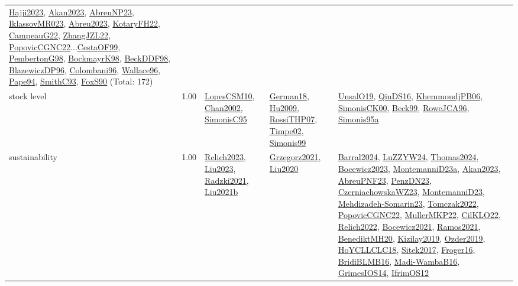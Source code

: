 {\begin{longtable}{p{3cm}r>{\raggedright\arraybackslash}p{6cm}>{\raggedright\arraybackslash}p{6cm}>{\raggedright\arraybackslash}p{8cm}}
\hyperref[detail:Hajji2023]{Hajji2023}, \hyperref[detail:Akan2023]{Akan2023}, \hyperref[detail:AbreuNP23]{AbreuNP23}, \hyperref[detail:IklassovMR023]{IklassovMR023}, \hyperref[detail:Abreu2023]{Abreu2023}, \hyperref[detail:KotaryFH22]{KotaryFH22}, \hyperref[detail:CampeauG22]{CampeauG22}, \hyperref[detail:ZhangJZL22]{ZhangJZL22}, \hyperref[detail:PopovicCGNC22]{PopovicCGNC22}...\hyperref[detail:CestaOF99]{CestaOF99}, \hyperref[detail:PembertonG98]{PembertonG98}, \hyperref[detail:BockmayrK98]{BockmayrK98}, \hyperref[detail:BeckDDF98]{BeckDDF98}, \hyperref[detail:BlazewiczDP96]{BlazewiczDP96}, \hyperref[detail:Colombani96]{Colombani96}, \hyperref[detail:Wallace96]{Wallace96}, \hyperref[detail:Pape94]{Pape94}, \hyperref[detail:SmithC93]{SmithC93}, \hyperref[detail:FoxS90]{FoxS90} (Total: 172)\\
\index{stock level}\index{Concepts!stock level}stock level &  1.00 & \hyperref[detail:LopesCSM10]{LopesCSM10}, \hyperref[detail:Chan2002]{Chan2002}, \hyperref[detail:SimonisC95]{SimonisC95} & \hyperref[detail:German18]{German18}, \hyperref[detail:Hu2009]{Hu2009}, \hyperref[detail:RossiTHP07]{RossiTHP07}, \hyperref[detail:Timpe02]{Timpe02}, \hyperref[detail:Simonis99]{Simonis99} & \hyperref[detail:UnsalO19]{UnsalO19}, \hyperref[detail:QinDS16]{QinDS16}, \hyperref[detail:KhemmoudjPB06]{KhemmoudjPB06}, \hyperref[detail:SimonisCK00]{SimonisCK00}, \hyperref[detail:Beck99]{Beck99}, \hyperref[detail:RoweJCA96]{RoweJCA96}, \hyperref[detail:Simonis95a]{Simonis95a}\\
\index{sustainability}\index{Concepts!sustainability}sustainability &  1.00 & \hyperref[detail:Relich2023]{Relich2023}, \hyperref[detail:Liu2023]{Liu2023}, \hyperref[detail:Radzki2021]{Radzki2021}, \hyperref[detail:Liu2021b]{Liu2021b} & \hyperref[detail:Grzegorz2021]{Grzegorz2021}, \hyperref[detail:Liu2020]{Liu2020} & \hyperref[detail:Barral2024]{Barral2024}, \hyperref[detail:LuZZYW24]{LuZZYW24}, \hyperref[detail:Thomas2024]{Thomas2024}, \hyperref[detail:Bocewicz2023]{Bocewicz2023}, \hyperref[detail:MontemanniD23a]{MontemanniD23a}, \hyperref[detail:Akan2023]{Akan2023}, \hyperref[detail:AbreuPNF23]{AbreuPNF23}, \hyperref[detail:PenzDN23]{PenzDN23}, \hyperref[detail:CzerniachowskaWZ23]{CzerniachowskaWZ23}, \hyperref[detail:MontemanniD23]{MontemanniD23}, \hyperref[detail:Mehdizadeh-Somarin23]{Mehdizadeh-Somarin23}, \hyperref[detail:Tomczak2022]{Tomczak2022}, \hyperref[detail:PopovicCGNC22]{PopovicCGNC22}, \hyperref[detail:MullerMKP22]{MullerMKP22}, \hyperref[detail:CilKLO22]{CilKLO22}, \hyperref[detail:Relich2022]{Relich2022}, \hyperref[detail:Bocewicz2021]{Bocewicz2021}, \hyperref[detail:Ramos2021]{Ramos2021}, \hyperref[detail:BenediktMH20]{BenediktMH20}, \hyperref[detail:Kizilay2019]{Kizilay2019}, \hyperref[detail:Ozder2019]{Ozder2019}, \hyperref[detail:HoYCLLCLC18]{HoYCLLCLC18}, \hyperref[detail:Sitek2017]{Sitek2017}, \hyperref[detail:Froger16]{Froger16}, \hyperref[detail:BridiBLMB16]{BridiBLMB16}, \hyperref[detail:Madi-WambaB16]{Madi-WambaB16}, \hyperref[detail:GrimesIOS14]{GrimesIOS14}, \hyperref[detail:IfrimOS12]{IfrimOS12}\\

\end{longtable}}
